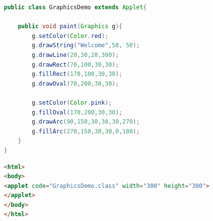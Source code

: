 \documentclass[11pt]{article}
\begin{document}
\begin{enumerate}
\begin{enumerate}
\begin{lstlisting}[language=Java]
public class GraphicsDemo extends Applet{  

	public void paint(Graphics g){  
		g.setColor(Color.red);  
		g.drawString("Welcome",50, 50);  
		g.drawLine(20,30,20,300);  
		g.drawRect(70,100,30,30);  
		g.fillRect(170,100,30,30);  
		g.drawOval(70,200,30,30);  

		g.setColor(Color.pink);  
		g.fillOval(170,200,30,30);  
		g.drawArc(90,150,30,30,30,270);  
		g.fillArc(270,150,30,30,0,180);  
	}  
} 
				\end{lstlisting}
		            \begin{lstlisting}[language=html]
<html>  
<body>  
<applet code="GraphicsDemo.class" width="300" height="300">  
</applet>  
</body>  
</html>  
				\end{lstlisting}
	      \end{enumerate}
\end{enumerate}
\end{document}
